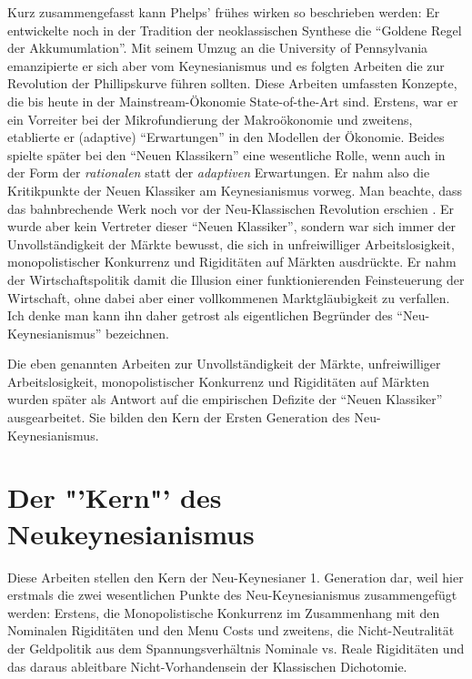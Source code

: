 Kurz zusammengefasst kann Phelps' frühes wirken so beschrieben werden: Er entwickelte noch in der Tradition der neoklassischen Synthese die "`Goldene Regel der Akkumumlation"'. Mit seinem Umzug an die University of Pennsylvania emanzipierte er sich aber vom Keynesianismus und es folgten Arbeiten die zur Revolution der Phillipskurve führen sollten. Diese Arbeiten umfassten Konzepte, die bis heute in der Mainstream-Ökonomie State-of-the-Art sind. Erstens, war er ein Vorreiter bei der Mikrofundierung der Makroökonomie und zweitens, etablierte er (adaptive) "`Erwartungen"' in den Modellen der Ökonomie. Beides spielte später bei den "`Neuen Klassikern"' eine wesentliche Rolle, wenn auch in der Form der \textit{rationalen} statt der \textit{adaptiven} Erwartungen. Er nahm also die Kritikpunkte der Neuen Klassiker am Keynesianismus vorweg. Man beachte, dass das bahnbrechende Werk \textcite{Phelps1968} noch vor der Neu-Klassischen Revolution erschien \parencite{Lucas1972, Lucas1976}. Er wurde aber kein Vertreter dieser "`Neuen Klassiker"', sondern war sich immer der Unvollständigkeit der Märkte bewusst, die sich in unfreiwilliger Arbeitslosigkeit, monopolistischer Konkurrenz und Rigiditäten auf Märkten ausdrückte. Er nahm der Wirtschaftspolitik damit die Illusion einer funktionierenden Feinsteuerung der Wirtschaft, ohne dabei aber einer vollkommenen Marktgläubigkeit zu verfallen. Ich denke man kann ihn daher getrost als eigentlichen Begründer des "`Neu-Keynesianismus"' bezeichnen.

Die eben genannten Arbeiten zur Unvollständigkeit der Märkte, unfreiwilliger Arbeitslosigkeit, monopolistischer Konkurrenz und Rigiditäten auf Märkten wurden später als Antwort auf die empirischen Defizite der "`Neuen Klassiker"' ausgearbeitet. Sie bilden den Kern der Ersten Generation des Neu-Keynesianismus.


\section{Der "'Kern"' des Neukeynesianismus}
\label{Kern}

Diese Arbeiten stellen den Kern der Neu-Keynesianer 1. Generation dar, weil hier erstmals die zwei wesentlichen Punkte des Neu-Keynesianismus zusammengefügt werden: Erstens, die Monopolistische Konkurrenz im Zusammenhang mit den Nominalen Rigiditäten und den Menu Costs und zweitens, die Nicht-Neutralität der Geldpolitik aus dem Spannungsverhältnis Nominale vs. Reale Rigiditäten und das daraus ableitbare Nicht-Vorhandensein der Klassischen Dichotomie. \parencite{RomerDavid1993}

